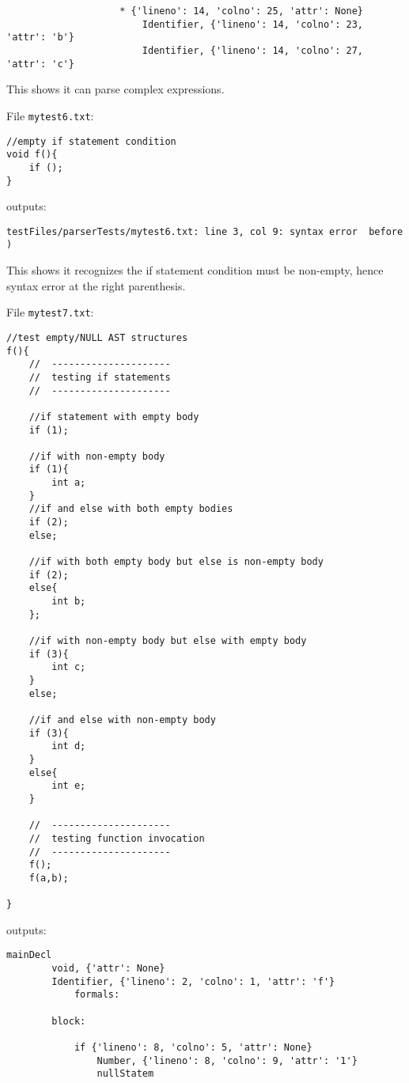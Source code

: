 \documentclass{article}
\begin{document}
\begin{itemize}
\begin{verbatim}
                    * {'lineno': 14, 'colno': 25, 'attr': None}
                        Identifier, {'lineno': 14, 'colno': 23, 'attr': 'b'}
                        Identifier, {'lineno': 14, 'colno': 27, 'attr': 'c'}
        \end{verbatim}
        This shows it can parse complex expressions.

        File \verb|mytest6.txt|:
        \begin{verbatim}
//empty if statement condition
void f(){
    if ();
}
        \end{verbatim}
        outputs:
        \begin{verbatim}
testFiles/parserTests/mytest6.txt: line 3, col 9: syntax error  before )
        \end{verbatim}
        This shows it recognizes the if statement condition must be non-empty, hence syntax error at the right parenthesis.

        File \verb|mytest7.txt|:
        \begin{verbatim}
//test empty/NULL AST structures 
f(){
    //  ---------------------
    //  testing if statements
    //  ---------------------

    //if statement with empty body
    if (1);

    //if with non-empty body
    if (1){
        int a;
    }
    //if and else with both empty bodies
    if (2);
    else;

    //if with both empty body but else is non-empty body
    if (2);
    else{
        int b;
    };

    //if with non-empty body but else with empty body
    if (3){
        int c;
    }
    else;

    //if and else with non-empty body
    if (3){
        int d;
    }
    else{
        int e;
    }

    //  ---------------------
    //  testing function invocation
    //  ---------------------
    f();
    f(a,b);

}
        \end{verbatim}
        outputs:
        \begin{verbatim}
mainDecl
        void, {'attr': None}
        Identifier, {'lineno': 2, 'colno': 1, 'attr': 'f'}
            formals:

        block:

            if {'lineno': 8, 'colno': 5, 'attr': None}
                Number, {'lineno': 8, 'colno': 9, 'attr': '1'}
                nullStatem


\end{verbatim}
\end{itemize}
\end{document}
